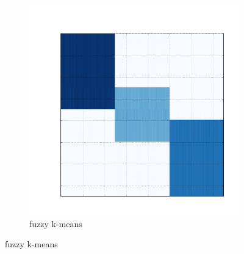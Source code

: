 \documentclass[10pt]{beamer}
\begin{document}
\begin{frame}
\begin{figure}[H]
\begin{subfigure}[b]{0.3\textwidth}
          \includegraphics[width=\textwidth]{img/e-reconstruction-2-fkmeans.png}
          \caption*{fuzzy k-means}
      \end{subfigure}
  \end{figure}


\end{frame}



\end{document}
